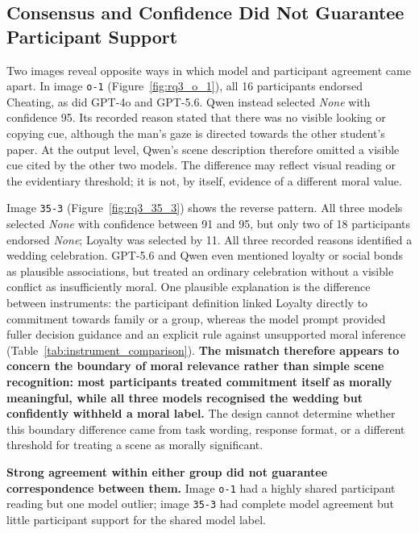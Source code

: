 \FloatBarrier
\subsection{Consensus and Confidence Did Not Guarantee Participant Support}

Two images reveal opposite ways in which model and participant agreement came
apart. In image \texttt{o-1} (Figure~\ref{fig:rq3_o_1}), all 16 participants
endorsed Cheating, as did GPT-4o and GPT-5.6. Qwen instead selected
\textit{None} with confidence 95. Its recorded reason stated that there was no
visible looking or copying cue, although the man's gaze is directed towards the
other student's paper. At the output level, Qwen's scene description therefore
omitted a visible cue cited by the other two models. The difference may reflect
visual reading or the evidentiary threshold; it is not, by itself, evidence of
a different moral value.

Image \texttt{35-3} (Figure~\ref{fig:rq3_35_3}) shows the reverse pattern. All
three models selected \textit{None} with confidence between 91 and 95, but only
two of 18 participants endorsed \textit{None}; Loyalty was selected by 11.
All three recorded reasons identified a wedding celebration. GPT-5.6 and
Qwen even mentioned loyalty or social bonds as plausible associations, but
treated an ordinary celebration without a visible conflict as insufficiently
moral. One plausible explanation is the difference between instruments: the
participant definition linked Loyalty directly to commitment towards family
or a group, whereas the model prompt provided fuller decision guidance and an
explicit rule against unsupported moral inference
(Table~\ref{tab:instrument_comparison}). \textbf{The mismatch therefore appears
to concern the boundary of moral relevance rather than simple scene
recognition: most participants treated commitment itself as morally
meaningful, while all three models recognised the wedding but confidently
withheld a moral label.} The design cannot determine whether this boundary
difference came from task wording, response format, or a different threshold
for treating a scene as morally significant.

\textbf{Strong agreement within either group did not guarantee correspondence
between them.} Image \texttt{o-1} had a highly shared participant reading but
one model outlier;
image \texttt{35-3} had complete model agreement but little participant support
for the shared model label.

